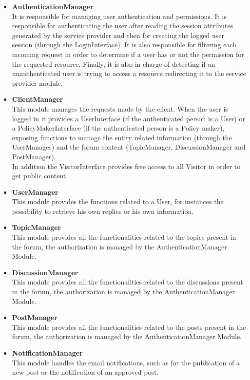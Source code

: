 \begin{itemize}
    \item \textbf{AuthenticationManager}\\
    It is responsible for managing user authentication and permissions. It is responsible for authenticating the user after reading the session attributes generated by the service provider and then for creating the logged user session (through the LoginInterface). It is also responsible for filtering each incoming request in order to determine if a user has or not the permission for the requested resource. Finally, it is also in charge of detecting if an unauthenticated user is trying to access a resource redirecting it to the service provider module.
    
    \item \textbf{ClientManager}\\
    This module manages the requests made by the client. When the user is logged in it provides a UserInterface (if the authenticated person is a User) or a PolicyMakerInterface (if the authenticated person is a Policy maker), exposing functions to manage the entity related information (through the UserManager) and the forum content (TopicManager, DiscussionManager and PostManager).\\
    In addition the VisitorInterface provides free access to all Visitor in order to get public content.
    
    \item \textbf{UserManager}\\
    This module provides the functions related to a User, for instances the possibility to retrieve his own replies or his own information.
    
    \item \textbf{TopicManager}\\
    This module provides all the functionalities related to the topics present in the forum, the authorization is managed by the AuthenticationManager Module.
    
    \item \textbf{DiscussionManager}\\
    This module provides all the functionalities related to the discussions present in the forum, the authorization is managed by the AuthenticationManager Module.
    
    \item \textbf{PostManager}\\
    This module provides all the functionalities related to the posts present in the forum, the authorization is managed by the AuthenticationManager Module.
    
    \item \textbf{NotificationManager}\\
    This module handles the email notifications, such as for the publication of a new post or the notification of an approved post.
\end{itemize}
